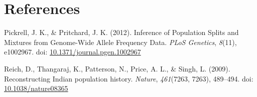 \documentclass[11pt,]{article}
\begin{document}
\section*{References}\label{references}

\hypertarget{refs}{}
\hypertarget{ref-pickrellInferencePopulationSplits2012}{}
Pickrell, J. K., \& Pritchard, J. K. (2012). Inference of Population
Splits and Mixtures from Genome-Wide Allele Frequency Data. \emph{PLoS
Genetics}, \emph{8}(11), e1002967. doi:
\href{https://doi.org/10.1371/journal.pgen.1002967}{10.1371/journal.pgen.1002967}

\hypertarget{ref-reichReconstructingIndianPopulation2009}{}
Reich, D., Thangaraj, K., Patterson, N., Price, A. L., \& Singh, L.
(2009). Reconstructing Indian population history. \emph{Nature},
\emph{461}(7263, 7263), 489--494. doi:
\href{https://doi.org/10.1038/nature08365}{10.1038/nature08365}
\end{document}
